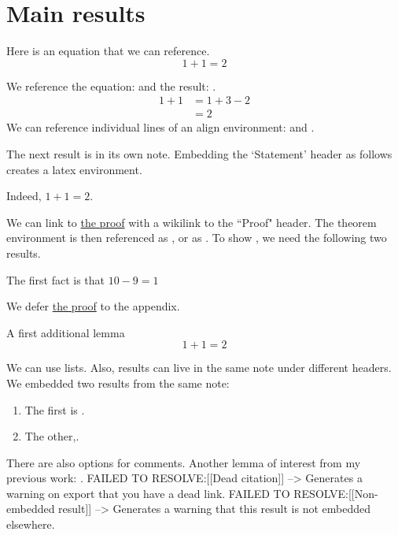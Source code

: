 \documentclass{article}
\begin{document}
\section{Main results}
\label{loc:body.main_results}
Here is an equation that we can reference.
\begin{equation}
\label{eq:main}
1+1 = 2
\end{equation}
\begin{lemma}
\label{lem:explicit}
We reference the equation:  and the result: .
\begin{align}
1+1 & = 1+3-2 \label{eq:aligned_eq:1}\\
& = 2 \label{eq:aligned_eq:2}
\end{align}
We can reference individual lines of an align environment:  and .
\end{lemma}
The next result is in its own note. Embedding the `Statement' header as follows creates a latex environment.
\begin{theorem}
\label{loc:theorem_1.statement}
Indeed, $1+1  =  2$.
\end{theorem}
We can link to \hyperlink{loc:theorem_1.proof}{the proof} with a wikilink to the ``Proof" header.
The theorem environment is then referenced as , or as . To show , we need the following two results.
\begin{lemma}
\label{loc:lemma_1.statement}
The first fact is that $10-9 = 1$
\end{lemma}
We defer \hyperlink{loc:lemma_1.proof}{the proof} to the appendix.
\begin{lemma}
\label{loc:other_small_lemmas.first_other_lemma}
A first additional lemma
\begin{equation*}
1+1 = 2
\end{equation*}
\end{lemma}
We can use lists. Also, results can live in the same note under different headers. We embedded two results from the same note: 
\begin{enumerate}
\item The first is .
\item The other,.
\end{enumerate}

There are also options for comments.
Another lemma of interest from my previous work: \cite[Proposition 3.1]{scottpaper}.
FAILED TO RESOLVE:[[Dead citation]] --> Generates a warning on export that you have a dead link.
FAILED TO RESOLVE:[[Non-embedded result]] --> Generates a warning that this result is not embedded elsewhere.
\end{document}
